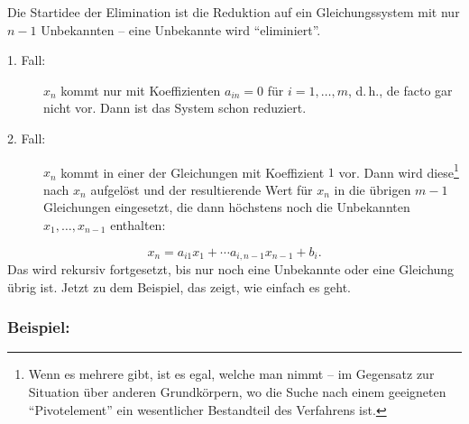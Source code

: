 \begin{refsegment}
Die Startidee der
Elimination ist die Reduktion auf ein Gleichungssystem mit nur $n-1$
Unbekannten -- eine Unbekannte wird "`eliminiert"'.
\begin{description}
   \item[1. Fall:] $x_n$ kommt nur mit Koeffizienten $a_{in} = 0$ für
      $i = 1, \ldots, m$, d.\,h.,
      de facto gar nicht vor. Dann ist das System schon reduziert.
   \item[2. Fall:] $x_n$ kommt in einer der Gleichungen mit Koeffizient $1$
      vor. Dann wird diese\footnote{%
         Wenn es mehrere gibt, ist es egal, welche man nimmt -- im
         Gegensatz zur Situation über anderen Grundkörpern, wo die
         Suche nach einem geeigneten "`Pivotelement"' ein wesentlicher
         Bestandteil des Verfahrens ist.
      } nach $x_n$ aufgelöst und der resultierende Wert für $x_n$
      in die übrigen \mbox{$m-1$} Gleichungen eingesetzt, die dann höchstens noch die
      Unbekannten $x_1, \ldots, x_{n-1}$ enthalten:
\end{description}
\[
     x_n = a_{i1} x_1 + \cdots a_{i,n-1} x_{n-1} + b_i.
\]
Das wird rekursiv fortgesetzt, bis nur noch eine Unbekannte oder eine
Gleichung übrig ist. Jetzt zu dem Beispiel, das zeigt, wie einfach es geht.

\subsubsection*{Beispiel:}


\end{refsegment}
